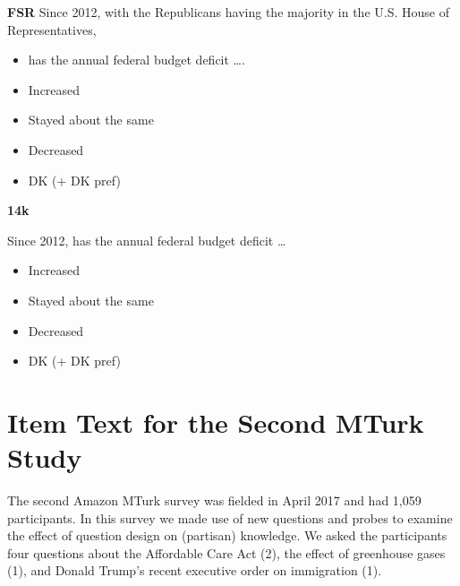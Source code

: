 \begin{itemize}
\textbf{FSR}\newline
Since 2012, with the Republicans having the majority in the U.S. House of
Representatives,
\begin{itemize}
	\item has the annual federal budget deficit \ldots.
	\item Increased
	\item Stayed about the same
	\item Decreased
	\item DK (+ DK pref)
\end{itemize}

\textbf{14k}\newline

Since 2012, has the annual federal budget deficit \ldots
\begin{itemize}
	\item Increased
	\item Stayed about the same
	\item Decreased
	\item DK (+ DK pref)
\end{itemize}
\end{itemize}

\newpage




\clearpage
\section{Item Text for the Second MTurk Study}\label{si:mturk2}


The second Amazon MTurk survey was fielded in April 2017 and had 1,059 participants. In this survey we made use of new questions and probes to examine the effect of question design on (partisan) knowledge. We asked the participants four questions about the Affordable Care Act (2), the effect of greenhouse gases (1), and Donald Trump's recent executive order on immigration (1).

